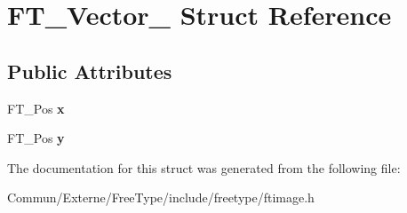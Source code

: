 \hypertarget{struct_f_t___vector__}{}\section{F\+T\+\_\+\+Vector\+\_\+ Struct Reference}
\label{struct_f_t___vector__}
\subsection*{Public Attributes}
\begin{DoxyCompactItemize}
\item 
F\+T\+\_\+\+Pos {\bfseries x}\hypertarget{struct_f_t___vector___a941e818e6dfca06409cddff4f325f74c}{}\label{struct_f_t___vector___a941e818e6dfca06409cddff4f325f74c}

\item 
F\+T\+\_\+\+Pos {\bfseries y}\hypertarget{struct_f_t___vector___ac3246ed214e880047ec74eeb15f8b973}{}\label{struct_f_t___vector___ac3246ed214e880047ec74eeb15f8b973}

\end{DoxyCompactItemize}


The documentation for this struct was generated from the following file\+:\begin{DoxyCompactItemize}
\item 
Commun/\+Externe/\+Free\+Type/include/freetype/ftimage.\+h\end{DoxyCompactItemize}
